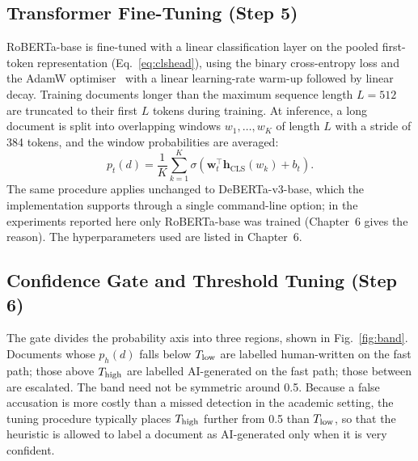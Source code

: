 \subsection{Transformer Fine-Tuning (Step 5)}

RoBERTa-base is fine-tuned with a linear classification layer on the pooled
first-token representation (Eq.~\eqref{eq:clshead}), using the binary
cross-entropy loss and the AdamW optimiser~\cite{loshchilov2019adamw} with a
linear learning-rate warm-up followed by linear decay. Training documents
longer than the maximum sequence length $L=512$ are truncated to their first
$L$ tokens during training. At inference, a long document is split into
overlapping windows $w_1,\ldots,w_K$ of length $L$ with a stride of 384 tokens,
and the window probabilities are averaged:
\begin{equation}
  p_t(d) = \frac{1}{K}\sum_{k=1}^{K} \sigma\!\left(\mathbf{w}_t^{\top}\mathbf{h}_{\mathrm{CLS}}(w_k) + b_t\right).
  \label{eq:windows}
\end{equation}
The same procedure applies unchanged to DeBERTa-v3-base, which the
implementation supports through a single command-line option; in the
experiments reported here only RoBERTa-base was trained (Chapter~6 gives the
reason). The hyperparameters used are listed in Chapter~6.

\subsection{Confidence Gate and Threshold Tuning (Step 6)}

The gate divides the probability axis into three regions, shown in
Fig.~\ref{fig:band}. Documents whose $p_h(d)$ falls below $T_{\mathrm{low}}$ are labelled
human-written on the fast path; those above $T_{\mathrm{high}}$ are labelled AI-generated
on the fast path; those between are escalated. The band need not be symmetric
around 0.5. Because a false accusation is more costly than a missed detection
in the academic setting, the tuning procedure typically places $T_{\mathrm{high}}$ further
from 0.5 than $T_{\mathrm{low}}$, so that the heuristic is allowed to label a document
as AI-generated only when it is very confident.

